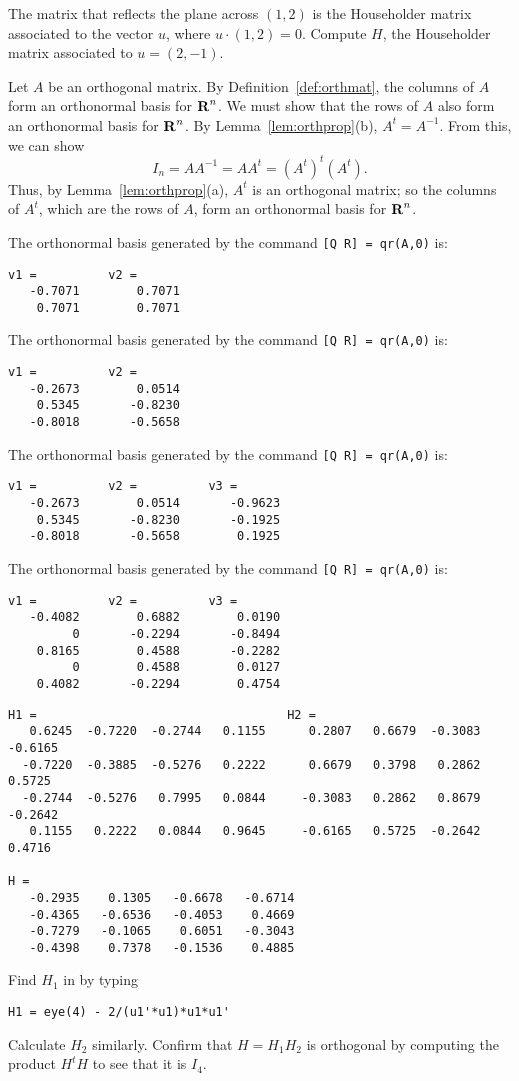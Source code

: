 \soln The matrix that reflects the plane across $(1,2)$ is the
Householder matrix associated to the vector $u$, where $u \cdot (1,2)
= 0$.  Compute $H$, the Householder matrix associated to $u = (2,-1)$.

Let $A$ be an orthogonal matrix.  By
Definition~\ref{def:orthmat}, the columns of $A$ form an orthonormal
basis for $\mbox{$\bf{R}$}^n$.  We must show that the rows of $A$ also form an
orthonormal basis for $\mbox{$\bf{R}$}^n$.  By Lemma~\ref{lem:orthprop}(b), $A^t =
A^{-1}$.  From this, we can show
\[
I_n = AA^{-1} = AA^t = (A^t)^t(A^t).
\]
Thus, by Lemma~\ref{lem:orthprop}(a), $A^t$ is an orthogonal matrix;
so the columns of $A^t$, which are the rows of $A$, form an orthonormal
basis for $\mbox{$\bf{R}$}^n$.

The orthonormal basis generated by the command {\tt [Q R] = qr(A,0)} is:
\begin{verbatim}
v1 =          v2 =
   -0.7071        0.7071
    0.7071        0.7071
\end{verbatim}

The orthonormal basis generated by the command {\tt [Q R] = qr(A,0)} is:

\begin{verbatim}
v1 =          v2 =
   -0.2673        0.0514
    0.5345       -0.8230
   -0.8018       -0.5658
\end{verbatim}

The orthonormal basis generated by the command {\tt [Q R] = qr(A,0)} is:
\begin{verbatim}
v1 =          v2 =          v3 = 
   -0.2673        0.0514       -0.9623
    0.5345       -0.8230       -0.1925
   -0.8018       -0.5658        0.1925
\end{verbatim}

The orthonormal basis generated by the command {\tt [Q R] = qr(A,0)} is:

\begin{verbatim}
v1 =          v2 =          v3 = 
   -0.4082        0.6882        0.0190
         0       -0.2294       -0.8494
    0.8165        0.4588       -0.2282
         0        0.4588        0.0127
    0.4082       -0.2294        0.4754
\end{verbatim}

\ans
\begin{verbatim}
H1 =                                   H2 =
   0.6245  -0.7220  -0.2744   0.1155      0.2807   0.6679  -0.3083  -0.6165
  -0.7220  -0.3885  -0.5276   0.2222      0.6679   0.3798   0.2862   0.5725
  -0.2744  -0.5276   0.7995   0.0844     -0.3083   0.2862   0.8679  -0.2642
   0.1155   0.2222   0.0844   0.9645     -0.6165   0.5725  -0.2642   0.4716

H =
   -0.2935    0.1305   -0.6678   -0.6714
   -0.4365   -0.6536   -0.4053    0.4669
   -0.7279   -0.1065    0.6051   -0.3043
   -0.4398    0.7378   -0.1536    0.4885
\end{verbatim}

\soln Find $H_1$ in \Matlab by typing
\begin{verbatim}
H1 = eye(4) - 2/(u1'*u1)*u1*u1'
\end{verbatim}

Calculate $H_2$ similarly.  Confirm that $H = H_1H_2$ is orthogonal by
computing the product $H^tH$ to see that it is $I_4$.
